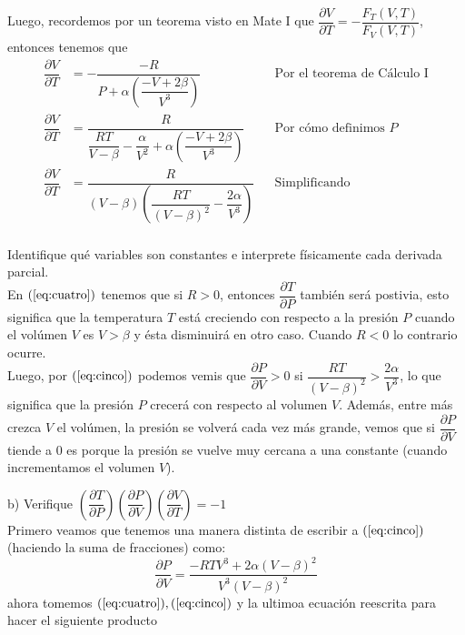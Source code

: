 \documentclass[letterpaper]{article}
\renewcommand{\d}{\partial}
\renewcommand{\*}{\cdot}
\theoremstyle{definition}
\begin{document}
Luego, recordemos por un teorema visto en Mate I que 
$ \dfrac{\d V}{\d T} = - \dfrac{F_T(V,T)}{F_V(V,T)} $, entonces tenemos que 
\begin{align*}
	\dfrac{\d V}{\d T} &= - \dfrac{-R}{ P + \alpha\left( \dfrac{-V + 2\beta}{V^3} \right) } &&\text{Por el teorema de Cálculo I}\\
	\dfrac{\d V}{\d T} &=  \dfrac{R}{ \dfrac{RT}{V - \beta} - \dfrac{\alpha}{V^2}  + \alpha\left( \dfrac{-V + 2\beta}{V^3} \right) } &&\text{Por cómo definimos }P\\
	\dfrac{\d V}{\d T} &=  \dfrac{R}{ (V - \beta) \left(\dfrac{RT}{(V - \beta)^2} - \dfrac{2\alpha}{V^3}\right)} &&\text{Simplificando }\\
\end{align*}


Identifique qué variables son constantes e interprete físicamente cada derivada parcial.\\

En $ (\ref{eq:cuatro}) $ tenemos que si $ R > 0 $, entonces $ \dfrac{\d T}{\d P} $ también será postivia, esto significa que la temperatura $ T $ está creciendo con respecto a la presión $ P $ cuando el volúmen $ V $ es $ V > \beta $ y ésta disminuirá en otro caso. Cuando $ R<0 $ lo contrario ocurre.\\

Luego, por $ (\ref{eq:cinco}) $ podemos vemis que $ \dfrac{\d P}{\d V} > 0$ si $ \dfrac{RT}{(V - \beta)^2} > \dfrac{2\alpha}{V^3} $, lo que significa que la presión $ P $ crecerá con respecto al volumen $ V $. Además, entre más crezca $ V $ el volúmen, la presión se volverá cada vez más grande, vemos que si $ \dfrac{\d P}{\d V}  $ tiende a 0 es porque la presión se vuelve muy cercana a una constante (cuando incrementamos el volumen $ V $).

b) Verifique $ \left( \dfrac{\d T}{\d P}\right) \left( \dfrac{\d P}{\d V}\right)\left( \dfrac{\d V}{\d T}\right) = -1 $\\

Primero veamos que tenemos una manera distinta de escribir a $ (\ref{eq:cinco}) $ (haciendo la suma de fracciones)  como:
\[ \dfrac{\d P}{\d V} = \dfrac{-RTV^3 + 2\alpha(V - \beta)^2}{V^3(V-\beta)^2} \]
ahora tomemos $ (\ref{eq:cuatro}),(\ref{eq:cinco}) $ y la ultimoa ecuación reescrita para hacer el siguiente producto
\end{document}
